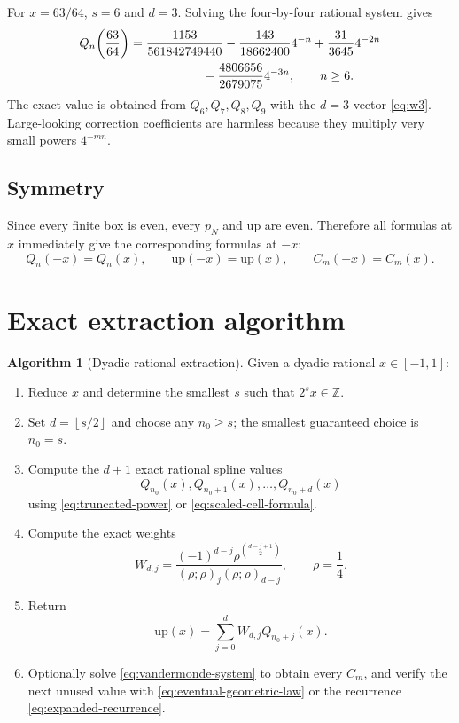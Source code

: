 \documentclass[11pt,oneside]{article}
\numberwithin{equation}{section}
\theoremstyle{definition}
\newtheorem{algorithm}[theorem]{Algorithm}
\theoremstyle{remark}
\newcommand{\Z}{\mathbb{Z}}
\newcommand{\upf}{\mathrm{up}}
\newcommand{\floor}[1]{\left\lfloor #1\right\rfloor}
\begin{document}
For $x=63/64$, $s=6$ and $d=3$.  Solving the four-by-four rational system gives
\begin{equation}
 \begin{aligned}
 Q_n\!\left(\frac{63}{64}\right)
 ={}&\frac{1153}{561842749440}
 -\frac{143}{18662400}4^{-n}
 +\frac{31}{3645}4^{-2n}\\
 &\hspace{1.6cm}
 -\frac{4806656}{2679075}4^{-3n},\qquad n\ge6.
 \end{aligned}
 \label{eq:sixty-three-law}
\end{equation}
The exact value is obtained from $Q_6,Q_7,Q_8,Q_9$ with the $d=3$ vector
\eqref{eq:w3}.  Large-looking correction coefficients are harmless because they
multiply very small powers $4^{-mn}$.

\subsection{Symmetry}

Since every finite box is even, every $p_N$ and $\upf$ are even.  Therefore all
formulas at $x$ immediately give the corresponding formulas at $-x$:
\begin{equation}
 Q_n(-x)=Q_n(x),\qquad \upf(-x)=\upf(x),\qquad C_m(-x)=C_m(x).
 \label{eq:even-symmetry}
\end{equation}

\section{Exact extraction algorithm}

\begin{algorithm}[Dyadic rational extraction]
\label{alg:extraction}
Given a dyadic rational $x\in[-1,1]$:
\begin{enumerate}
\item Reduce $x$ and determine the smallest $s$ such that $2^sx\in\Z$.
\item Set $d=\floor{s/2}$ and choose any $n_0\ge s$; the smallest guaranteed
choice is $n_0=s$.
\item Compute the $d+1$ exact rational spline values
\[
 Q_{n_0}(x),Q_{n_0+1}(x),\ldots,Q_{n_0+d}(x)
\]
using \eqref{eq:truncated-power} or \eqref{eq:scaled-cell-formula}.
\item Compute the exact weights
\[
 W_{d,j}=\frac{(-1)^{d-j}\rho^{\binom{d-j+1}{2}}}
 {(\rho;\rho)_j(\rho;\rho)_{d-j}},\qquad \rho=\frac14.
\]
\item Return
\[
 \upf(x)=\sum_{j=0}^{d}W_{d,j}Q_{n_0+j}(x).
\]
\item Optionally solve \eqref{eq:vandermonde-system} to obtain every $C_m$, and
verify the next unused value with \eqref{eq:eventual-geometric-law} or the
recurrence \eqref{eq:expanded-recurrence}.
\end{enumerate}
\end{algorithm}
\end{document}
